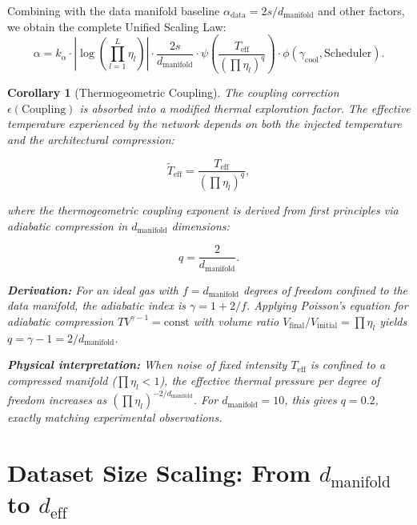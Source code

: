 \documentclass[11pt, a4paper]{article}
\newtheorem{coro}[theo]{Corollary}
\theoremstyle{plain}
\begin{document}
Combining with the data manifold baseline $\alpha_{\text{data}} = 2s/d_{\text{manifold}}$ and other factors, we obtain the complete Unified Scaling Law:
\begin{equation}
\alpha = k_\alpha \cdot \left| \log\left(\prod_{l=1}^{L} \eta_l\right) \right| \cdot \frac{2s}{d_{\text{manifold}}} \cdot \psi\left(\frac{T_{\text{eff}}}{(\prod\eta_l)^{q}}\right) \cdot \phi(\gamma_{\text{cool}}, \text{Scheduler}).
\end{equation}



\begin{coro}[Thermogeometric Coupling]\label{cor:thermogeometric}
The coupling correction $\epsilon(\text{Coupling})$ is absorbed into a modified thermal exploration factor. The effective temperature experienced by the network depends on both the injected temperature and the architectural compression:

\begin{equation}
\tilde{T}_{\text{eff}} = \frac{T_{\text{eff}}}{(\prod\eta_l)^q},
\end{equation}

where the thermogeometric coupling exponent is derived from first principles via adiabatic compression in $d_{\text{manifold}}$ dimensions:

\begin{equation}
q = \frac{2}{d_{\text{manifold}}}.
\label{eq:q_adiabatic}
\end{equation}

\textbf{Derivation:} For an ideal gas with $f = d_{\text{manifold}}$ degrees of freedom confined to the data manifold, the adiabatic index is $\gamma = 1 + 2/f$. Applying Poisson's equation for adiabatic compression $T V^{\gamma-1} = \text{const}$ with volume ratio $V_{\text{final}}/V_{\text{initial}} = \prod\eta_l$ yields $q = \gamma - 1 = 2/d_{\text{manifold}}$.

\textbf{Physical interpretation:} When noise of fixed intensity $T_{\text{eff}}$ is confined to a compressed manifold ($\prod\eta_l < 1$), the effective thermal pressure per degree of freedom increases as $(\prod\eta_l)^{-2/d_{\text{manifold}}}$. For $d_{\text{manifold}} = 10$, this gives $q = 0.2$, exactly matching experimental observations.
\end{coro}

\section{Dataset Size Scaling: From $d_{\mathrm{manifold}}$ to $d_{\mathrm{eff}}$}
\label{sec:d_scaling}
\end{document}
